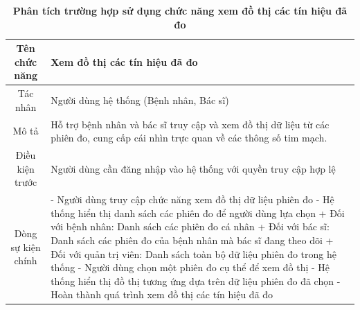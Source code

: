 \begin{table}[H]
	\caption{\bfseries \fontsize{12pt}{0pt}\selectfont Phân tích trường hợp sử dụng chức năng xem đồ thị các tín hiệu đã đo}
	\centering
	\begin{tabularx}{0.9\textwidth}{|c|X|}
		\hline
		\textbf{Tên chức năng} & \textbf{Xem đồ thị các tín hiệu đã đo}                                                                                           \\
		\hline
		Tác nhân               & Người dùng hệ thống (Bệnh nhân, Bác sĩ)                                                                                          \\
		\hline
		Mô tả                  & Hỗ trợ bệnh nhân và bác sĩ truy cập và xem đồ thị dữ liệu từ các phiên đo, cung cấp cái nhìn trực quan về các thông số tim mạch. \\
		\hline
		Điều kiện trước        & Người dùng cần đăng nhập vào hệ thống với quyền truy cập hợp lệ                                                                  \\
		\hline
		Dòng sự kiện chính     &
		- Người dùng truy cập chức năng xem đồ thị dữ liệu phiên đo \newline
		- Hệ thống hiển thị danh sách các phiên đo để người dùng lựa chọn \newline
		+ Đối với bệnh nhân: Danh sách các phiên đo cá nhân \newline
		+ Đối với bác sĩ: Danh sách các phiên đo của bệnh nhân mà bác sĩ đang theo dõi \newline
		+ Đối với quản trị viên: Danh sách toàn bộ dữ liệu phiên đo trong hệ thống \newline
		- Người dùng chọn một phiên đo cụ thể để xem đồ thị \newline
		- Hệ thống hiển thị đồ thị tương ứng dựa trên dữ liệu phiên đo đã chọn \newline
		- Hoàn thành quá trình xem đồ thị các tín hiệu đã đo                                                                                                      \\
		\hline
	\end{tabularx}
\end{table}

